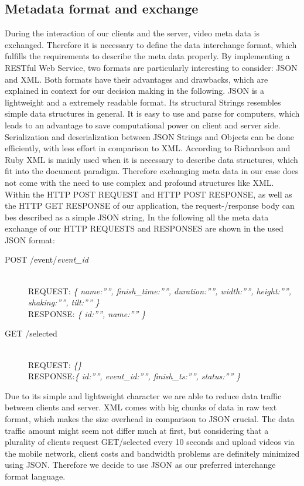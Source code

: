 \documentclass[conference]{IEEEtran}
\begin{document}
\subsection{Metadata format and exchange}
During the interaction of our clients and the server, video meta data is exchanged.
Therefore it is necessary to define the data interchange format, which fulfills the requirements to describe the meta data properly.
By implementing a RESTful Web Service, two formats are particularly interesting to consider: JSON and XML.
Both formats have their advantages and drawbacks, which are explained in context for our decision making in the following.
JSON is a lightweight and a extremely readable format. Its structural Strings resembles simple data structures in general. It is easy to use and parse for computers, which leads to an advantage to save 
computational power on client and server side. Serialization and deserialization between JSON Strings and Objects can be done efficiently, with less effort in comparison to XML.
According to Richardson and Ruby XML is mainly used when it is necessary to describe data structures, which fit into the document paradigm. 
Therefore exchanging meta data in our case does not come with the need to use complex and profound structures like XML. Within the HTTP POST REQUEST and HTTP POST RESPONSE, as well as the HTTP GET RESPONSE  of our application, the request-/response body can bes described as a simple JSON string,
In the following all the meta data exchange of our HTTP REQUESTS and RESPONSES are shown in the used JSON format:

\begin{description}
	\item[POST /event/\textit{event\_id}]\hfill\\	
				REQUEST: \textit{\{ name:””, finish\_time:””, duration:””, width:””, height:””, shaking:””, tilt:”” \}}\hfill \\
				RESPONSE: \textit{\{ id:””, name:”” \}}

	\item[GET /selected]\hfill\\		
				REQUEST: \textit{\{\}}\hfill \\
				RESPONSE:\textit{\{ id:””, event\_id:””, finish\_ts:””, status:”” \}}

\end{description}

Due to its simple and lightweight character we are able to reduce data traffic between clients and server. 
XML comes with big chunks of data in raw text format, which makes the size overhead in comparison to JSON crucial.
The data traffic amount might seem not differ much at first, but considering that a plurality of clients request GET/selected every 10 seconds and upload videos via the mobile network, client costs and bandwidth problems are definitely minimized using JSON. Therefore we decide to use JSON as our preferred interchange format language.
\end{document}
